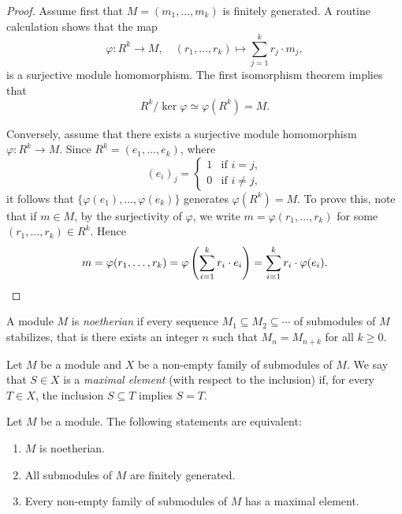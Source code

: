 \begin{proof}
    Assume first that $M=(m_1,\dots,m_k)$ is finitely generated. A routine calculation shows that
    the map
    \[
    \varphi\colon R^k\to M,\quad
    (r_1,\dots,r_k)\mapsto \sum_{j=1}^kr_j\cdot m_j,
    \]
    is a surjective module homomorphism. The first isomorphism theorem implies that 
    \[ 
    R^k/\ker\varphi\simeq\varphi(R^k)=M.
    \]
    
    Conversely, assume that there exists a 
    surjective module homomorphism $\varphi\colon R^k\to M$. Since 
    $R^k=(e_1,\dots,e_k)$, where 
    \[
    (e_i)_j=\begin{cases}
    1 & \text{if $i=j$},\\
    0 & \text{if $i\ne j$},
    \end{cases}
    \]
    it follows that $\{\varphi(e_1),\dots,\varphi(e_k)\}$ generates $\varphi(R^k)=M$. To prove this, note that  
    if $m\in M$, by the surjectivity of $\varphi$, we write $m=\varphi(r_1,\dots,r_k)$ for some $(r_1,\dots,r_k)\in R^k$. 
    Hence  
    \[
    m=\varphi(r_1,\dots,r_k)=\varphi\left(\sum_{i=1}^k r_i\cdot e_i\right)
    =\sum_{i=1}^kr_i\cdot\varphi(e_i).\qedhere
    \]
\end{proof}

\begin{definition}
    A module $M$ is \emph{noetherian} if every sequence $M_1\subseteq M_2\subseteq\cdots$ of submodules of $M$ 
    stabilizes, that is there exists an integer $n$ such that $M_n=M_{n+k}$ for all $k\geq0$. 	
\end{definition}

Let $M$ be a module and $X$ be a non-empty 
family of submodules of $M$. We say that $S\in X$ is a \emph{maximal 
element} (with respect to the inclusion) 
if, for every $T\in X$, the inclusion $S\subseteq T$ implies
$S=T$.

\begin{proposition}
Let $M$ be a module. The following statements are equivalent:
\begin{enumerate}
\item $M$ is noetherian.
\item All submodules of $M$ are finitely generated.
\item Every non-empty family of submodules of $M$ has a maximal element. 	
\end{enumerate}
\end{proposition}

